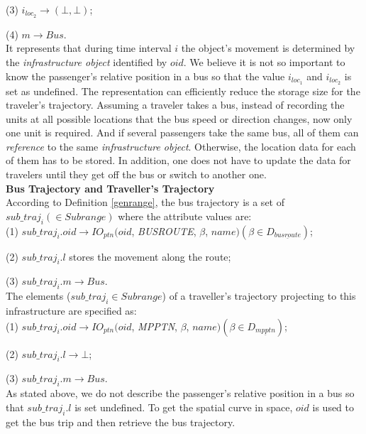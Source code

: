 (3) $i_{loc_2}\rightarrow (\bot,\bot)$; 

(4) $m\rightarrow Bus$. \\

It represents that during time interval $i$ the object's movement is determined by the \textit{infrastructure object} identified by $oid$. We believe it is not so important to know the passenger's relative position in a bus so that the value $i_{loc_1}$ and $i_{loc_2}$ is set as undefined. The representation can efficiently reduce the
storage size for the traveler's trajectory. Assuming a traveler takes a bus, 
instead of recording the units at all possible locations that the bus speed or direction 
changes, now only one unit is required. And if several passengers take the same bus, all of them
can \textit{reference} to the same \textit{infrastructure object}. Otherwise, the location data for each of them has to be stored. In addition, one does not have to update the data for travelers until they get off the bus or switch to another one. \\


\textbf{Bus Trajectory and Traveller's Trajectory} \\

According to Definition \ref{genrange}, the bus trajectory is a set of $sub\_traj_i(\in Subrange)$
where the attribute values are: \\

(1) $sub\_traj_i.oid \rightarrow IO_{ptn}(oid$, \textit{BUSROUTE}, $\beta$, $name)(\beta \in D_{\underline{busroute}})$;

(2) $sub\_traj_i.l$ stores the movement along the route;

(3) $sub\_traj_i.m \rightarrow Bus$. \\


The elements ($sub\_traj_i \in Subrange$) of a traveller's trajectory projecting to this infrastructure are specified as: \\

(1) $sub\_traj_i.oid \rightarrow IO_{ptn}(oid$, \textit{MPPTN}, $\beta$, $name)(\beta \in D_{\underline{mpptn}})$;

(2) $sub\_traj_i.l \rightarrow \bot$;

(3) $sub\_traj_i.m \rightarrow Bus$. \\

As stated above, we do not describe the passenger's relative position in a bus so that $sub\_traj_i.l$ is set undefined. To get the spatial curve in space, $oid$ is used to get the bus trip and then retrieve the bus trajectory. 

